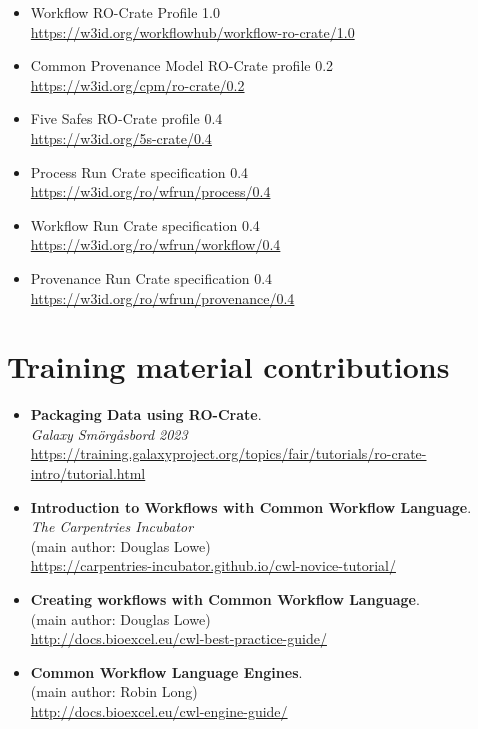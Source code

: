 \begin{itemize}
  \item Workflow RO-Crate Profile 1.0 \cite{Bacall 2022}\\
  \url{https://w3id.org/workflowhub/workflow-ro-crate/1.0}
  \item Common Provenance Model RO-Crate profile 0.2\\
  \url{https://w3id.org/cpm/ro-crate/0.2}
  \item Five Safes RO-Crate profile 0.4 \cite{Soiland-Reyes 2023e}\\
  \url{https://w3id.org/5s-crate/0.4}
  \item Process Run Crate specification 0.4 \cite{WRROC 2023a}\\
  \url{https://w3id.org/ro/wfrun/process/0.4}
  \item Workflow Run Crate specification 0.4 \cite{WRROC 2023b}\\
  \url{https://w3id.org/ro/wfrun/workflow/0.4}
  \item Provenance Run Crate specification 0.4 \cite{WRROC 2023c}\\
  \url{https://w3id.org/ro/wfrun/provenance/0.4}  
\end{itemize}


\section{Training material contributions}

\begin{itemize}
  \item
    \textbf{Packaging Data using RO-Crate}.\\
    \emph{Galaxy Smörgåsbord 2023}\\
    \url{https://training.galaxyproject.org/topics/fair/tutorials/ro-crate-intro/tutorial.html}
  \item
    \textbf{Introduction to Workflows with Common Workflow Language}.\\
    \emph{The Carpentries Incubator}\\
    (main author: Douglas Lowe)\\
    \url{https://carpentries-incubator.github.io/cwl-novice-tutorial/}
  \item
    \textbf{Creating workflows with Common Workflow Language}.\\
    (main author: Douglas Lowe)\\
    \url{http://docs.bioexcel.eu/cwl-best-practice-guide/}
  \item
    \textbf{Common Workflow Language Engines}.\\
    (main author: Robin Long)\\
    \url{http://docs.bioexcel.eu/cwl-engine-guide/}
  \end{itemize}


